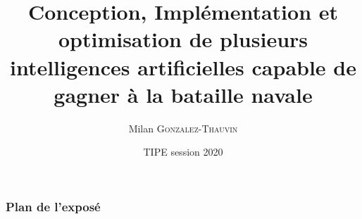 \documentclass{beamer}
\title[Bataille Navale]{Conception, Implémentation et optimisation de plusieurs
intelligences artificielles capable de gagner à la bataille navale}
\author{Milan \textsc{Gonzalez-Thauvin}}
\institute[ ]{Numéro Candidat : 3888\\Thème : Océan}
\date{TIPE session 2020}
\begin{document}
	\begin{frame}
	\titlepage 
	\end{frame}
	
	\begin{frame}
	\frametitle{Plan de l'exposé} 
	\tableofcontents 
	\end{frame}
	
	
	
	
	
	
	
\end{document}
